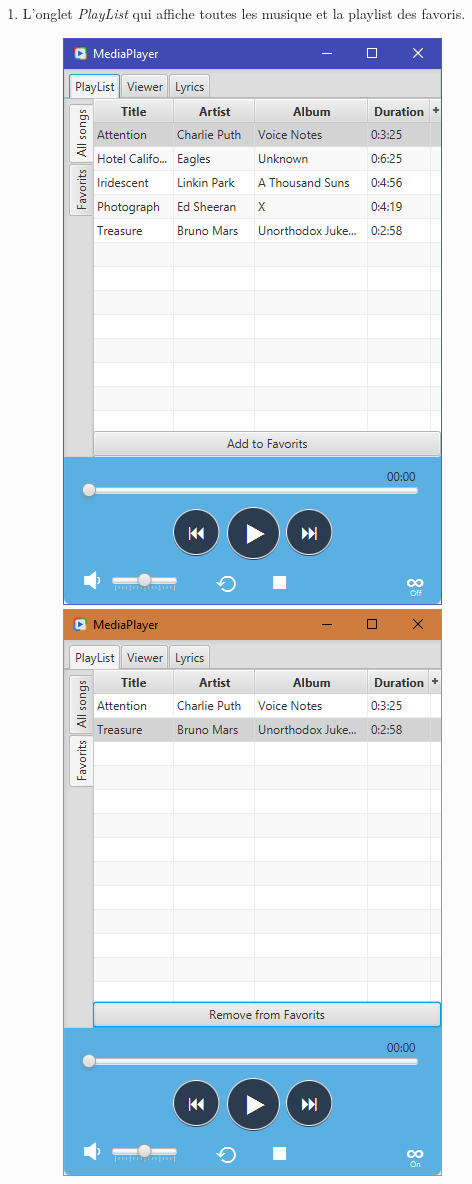 \documentclass[a4paper,12pt]{report} %
\begin{document}
\begin{enumerate}
		\newpage
		\item L'onglet \textit{PlayList} qui affiche toutes les musique et la playlist des favoris.
   			\begin{figure}[ht] 		
				\centering
  				\includegraphics[scale=0.65]{playList}
  				\hspace{5mm}
  				\includegraphics[scale=0.65]{favorit}
			\end{figure} 
	\end{enumerate}
	
\end{document}
